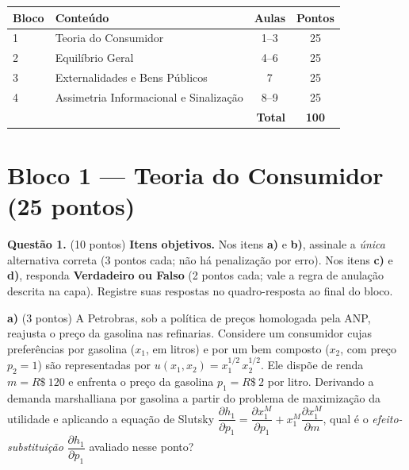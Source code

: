 
\ifsolucao\else
\begin{center}
\renewcommand{\arraystretch}{1.3}
\begin{tabular}{|l|l|c|c|}
\hline
\textbf{Bloco} & \textbf{Conteúdo} & \textbf{Aulas} & \textbf{Pontos} \\ \hline
1 & Teoria do Consumidor & 1--3 & 25 \\ \hline
2 & Equilíbrio Geral & 4--6 & 25 \\ \hline
3 & Externalidades e Bens Públicos & 7 & 25 \\ \hline
4 & Assimetria Informacional e Sinalização & 8--9 & 25 \\ \hline
\multicolumn{3}{|r|}{\textbf{Total}} & \textbf{100} \\ \hline
\end{tabular}
\end{center}
\vspace{0.5em}
\fi


\section*{Bloco 1 --- Teoria do Consumidor \hfill \normalsize (25 pontos)}

\textbf{Questão 1.} (10 pontos) \textbf{Itens objetivos.} Nos itens \textbf{a)} e \textbf{b)}, assinale a \emph{única} alternativa correta (3 pontos cada; não há penalização por erro). Nos itens \textbf{c)} e \textbf{d)}, responda \textbf{Verdadeiro ou Falso} (2 pontos cada; vale a regra de anulação descrita na capa). Registre suas respostas no quadro-resposta ao final do bloco.

\textbf{a)} (3 pontos) A Petrobras, sob a política de preços homologada pela ANP, reajusta o preço da gasolina nas refinarias. Considere um consumidor cujas preferências por gasolina ($x_1$, em litros) e por um bem composto ($x_2$, com preço $p_2=1$) são representadas por $u(x_1,x_2)=x_1^{1/2}\,x_2^{1/2}$. Ele dispõe de renda $m=R\$~120$ e enfrenta o preço da gasolina $p_1=R\$~2$ por litro. Derivando a demanda marshalliana por gasolina a partir do problema de maximização da utilidade e aplicando a equação de Slutsky $\dfrac{\partial h_1}{\partial p_1}=\dfrac{\partial x_1^{M}}{\partial p_1}+x_1^{M}\dfrac{\partial x_1^{M}}{\partial m}$, qual é o \emph{efeito-substituição} $\dfrac{\partial h_1}{\partial p_1}$ avaliado nesse ponto?

